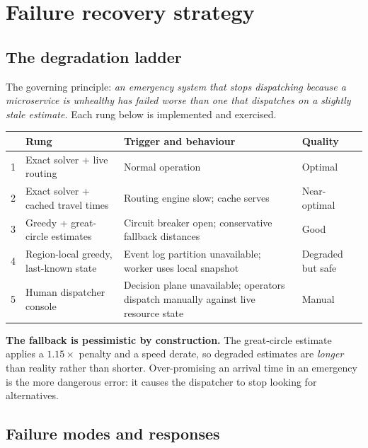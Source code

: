 \section{Failure recovery strategy}

\subsection{The degradation ladder}

The governing principle: \emph{an emergency system that stops dispatching
because a microservice is unhealthy has failed worse than one that dispatches
on a slightly stale estimate.} Each rung below is implemented and exercised.

\begin{center}\footnotesize
\begin{tabular}{@{}rlp{56mm}l@{}}
\toprule
& \textbf{Rung} & \textbf{Trigger and behaviour} & \textbf{Quality} \\
\midrule
1 & Exact solver + live routing & Normal operation & Optimal \\
2 & Exact solver + cached travel times & Routing engine slow; cache serves & Near-optimal \\
3 & Greedy + great-circle estimates & Circuit breaker open; conservative fallback distances & Good \\
4 & Region-local greedy, last-known state & Event log partition unavailable; worker uses local snapshot & Degraded but safe \\
5 & Human dispatcher console & Decision plane unavailable; operators dispatch manually against live resource state & Manual \\
\bottomrule
\end{tabular}
\end{center}

\begin{keybox}
\textbf{The fallback is pessimistic by construction.} The great-circle
estimate applies a $1.15\times$ penalty and a speed derate, so degraded
estimates are \emph{longer} than reality rather than shorter. Over-promising
an arrival time in an emergency is the more dangerous error: it causes the
dispatcher to stop looking for alternatives.
\end{keybox}

\subsection{Failure modes and responses}

